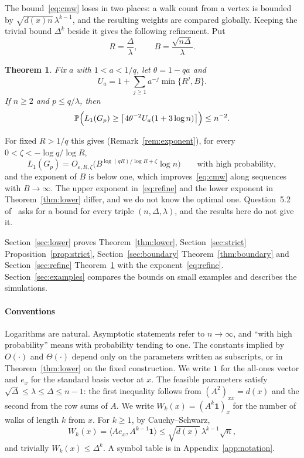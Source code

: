 \documentclass[11pt]{amsart}
\newtheorem{theorem}{Theorem}[section]
\theoremstyle{remark}
\newcommand{\PP}{\mathbb{P}}
\newcommand{\one}{\mathbf{1}}
\begin{document}
The bound~\eqref{eq:cmw} loses in two places: a walk count from a vertex is bounded by $\sqrt{d(x)n}\,\lambda^{k-1}$, and
the resulting weights are compared globally. Keeping the trivial bound $\Delta^k$ beside it gives the following
refinement. Put
\[
R=\frac{\Delta}{\lambda},\qquad B=\frac{\sqrt{n\Delta}}{\lambda}.
\]

\begin{theorem}\label{thm:refine}
Fix $a$ with $1<a<1/q$, let $\theta=1-qa$ and
\[
U_a=1+\sum_{j\ge1}a^{-j}\min\{R^j,B\}.
\]
If $n\ge2$ and $p\le q/\lambda$, then
\[
\PP\Bigl(L_1(G_p)\ge\big\lceil4\theta^{-2}U_a(1+3\log n)\big\rceil\Bigr)\le n^{-2}.
\]
\end{theorem}

For fixed $R>1/q$ this gives (Remark~\ref{rem:exponent}), for every $0<\zeta<-\log q/\log R$,
\begin{equation}\label{eq:refine}
L_1(G_p)=O_{\varepsilon,R,\zeta}\bigl(B^{\log(qR)/\log R+\zeta}\log n\bigr)\qquad\text{with high probability},
\end{equation}
and the exponent of $B$ is below one, which improves~\eqref{eq:cmw} along sequences with $B\to\infty$. The upper
exponent in~\eqref{eq:refine} and the lower exponent in Theorem~\ref{thm:lower} differ, and we do not know the optimal
one. Question~5.2 of~\cite{CMW26} asks for a bound for every triple $(n,\Delta,\lambda)$, and the results here do not
give it.

Section~\ref{sec:lower} proves Theorem~\ref{thm:lower}, Section~\ref{sec:strict} Proposition~\ref{prop:strict},
Section~\ref{sec:boundary} Theorem~\ref{thm:boundary} and Section~\ref{sec:refine} Theorem~\ref{thm:refine} with the
exponent~\eqref{eq:refine}. Section~\ref{sec:examples} compares the bounds on small examples and describes the
simulations.

\paragraph{Conventions}
Logarithms are natural. Asymptotic statements refer to $n\to\infty$, and ``with high probability'' means with
probability tending to one. The constants implied by $O(\cdot)$ and $\Theta(\cdot)$ depend only on the parameters
written as subscripts, or in Theorem~\ref{thm:lower} on the fixed construction. We write $\one$ for the all-ones
vector and $e_x$ for the standard basis vector at $x$. The feasible parameters satisfy $\sqrt\Delta\le\lambda\le\Delta\le n-1$: the first inequality
follows from $(A^2)_{xx}=d(x)$ and the second from the row sums of $A$. We write $W_k(x)=(A^k\one)_x$ for the number of
walks of length $k$ from $x$. For $k\ge1$, by Cauchy--Schwarz,
\begin{equation}\label{eq:walk}
W_k(x)=\langle Ae_x,A^{k-1}\one\rangle\le\sqrt{d(x)}\,\lambda^{k-1}\sqrt n,
\end{equation}
and trivially $W_k(x)\le\Delta^k$. A symbol table is in Appendix~\ref{app:notation}.
\end{document}
